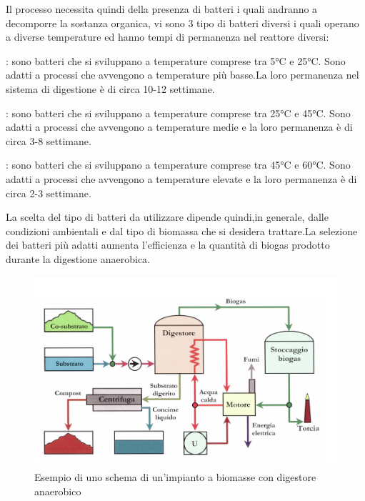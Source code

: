 Il processo necessita quindi della presenza di batteri i quali andranno a decomporre la sostanza organica, vi sono 3 tipo di batteri diversi i quali operano a diverse temperature ed hanno tempi di permanenza nel reattore diversi:\\
\begin{description}[labelindent=5mm]
    \item[$\bullet$ Batteri psicrofili]: sono batteri che si sviluppano a temperature comprese tra 5°C e 25°C. Sono adatti a processi che avvengono a temperature più basse.La loro permanenza nel sistema di digestione è di circa 10-12 settimane.
    \item[$\bullet$ Batteri mesofili]: sono batteri che si sviluppano a temperature comprese tra 25°C e 45°C. Sono adatti a processi che avvengono a temperature medie e la loro permanenza è di circa 3-8 settimane.
    \item[$\bullet$ Batteri termofili]: sono batteri che si sviluppano a temperature comprese tra 45°C e 60°C. Sono adatti a processi che avvengono a temperature elevate e la loro permanenza è di circa 2-3 settimane.
\end{description}
La scelta del tipo di batteri da utilizzare dipende quindi,in generale, dalle condizioni ambientali e dal tipo di biomassa che si desidera trattare.La selezione dei batteri più adatti aumenta l'efficienza e la quantità di biogas prodotto durante la digestione anaerobica.\\
\begin{figure}[H]
    \centering
    \includegraphics[height=0.5\textwidth]{res/cap 3/Biomasse}
    \caption{Esempio di uno schema di un'impianto a biomasse con digestore anaerobico\cite{Materiale_didattico_prof_savino}}
\end{figure}\noindent

